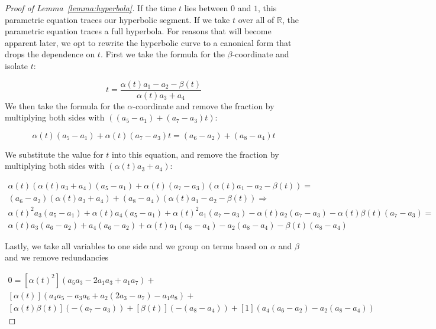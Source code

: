 \documentclass[a4paper, UKenglish]{paper}
\begin{document}
\begin{proof}[Proof of Lemma~\ref{lemma:hyperbola}]
  If the time $t$ lies between $0$ and $1$, this parametric equation traces our hyperbolic segment. If we take $t$ over all of $\mathbb{R}$, the parametric equation traces a full hyperbola. For reasons that will become apparent later, we opt to rewrite the hyperbolic curve to a canonical form that drops the dependence on $t$. First we take the formula for the $\beta$-coordinate and isolate $t$:
  
  \[
     t = \frac{\alpha(t) a_1 - a_2  - \beta(t)}{\alpha(t) a_3 + a_4}
  \]
We then take the formula for the $\alpha$-coordinate and remove the fraction by multiplying both sides with $ ((a_5 - a_1)  + (a_7 - a_3) t)$:

\[ 
\alpha(t)(a_5 - a_1)  + \alpha(t)(a_7 - a_3) t = (a_6 - a_2) + (a_8 - a_4) t
\]

We substitute the value for $t$ into this equation, and remove the fraction by multiplying both sides with $(\alpha(t) a_3 + a_4)$:

\begin{align*}
\alpha(t)(\alpha(t) a_3 + a_4)(a_5 - a_1)  + \alpha(t)(a_7 - a_3) (\alpha(t) a_1 - a_2  - \beta(t)) = \\
(a_6 - a_2)(\alpha(t) a_3 + a_4) + (a_8 - a_4) (\alpha(t) a_1 - a_2  - \beta(t)) \Rightarrow \\
\alpha(t)^2a_3(a_5 - a_1) + \alpha(t)a_4(a_5 - a_1)  + \alpha(t)^2a_1(a_7 - a_3)
- \alpha(t)a_2(a_7 - a_3)  - \alpha(t)\beta(t)(a_7 - a_3) = \\
\alpha(t) a_3(a_6 - a_2) + a_4(a_6 - a_2) + \alpha(t)a_1(a_8 - a_4) - a_2 (a_8 - a_4) - \beta(t)(a_8 - a_4) 
\end{align*}

Lastly, we take all variables to one side and we group on terms based on $\alpha$ and $\beta$ and we remove redundancies

\begin{align}
\label{eq:hyperbola}
    0= [\alpha(t)^2](a_5 a_3 -2 a_1 a_3 + a_1 a_7)+ \\
    [\alpha(t)](a_4 a_5 - a_3 a_6 + a_2 (2 a_3 - a_7) - a_1 a_8) + \\
    [\alpha(t)\beta(t)](-(a_7 - a_3)) + [\beta(t)](-(a_8 - a_4)) + [1](a_4(a_6 - a_2)- a_2 (a_8 - a_4))
\end{align}
\end{proof}
\end{document}
